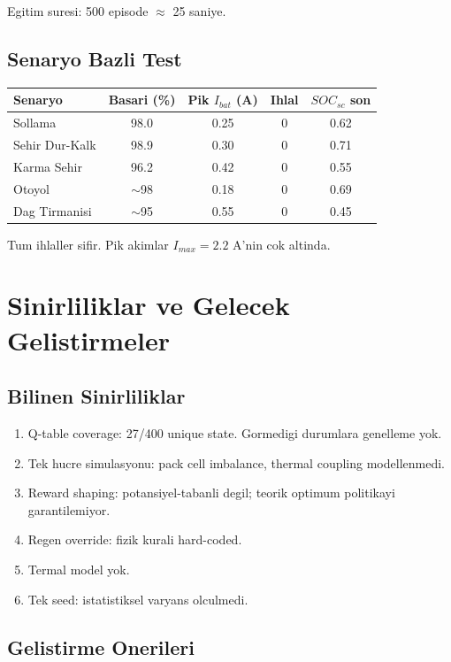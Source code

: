 \documentclass[11pt,a4paper]{article}
\begin{document}
Egitim suresi: 500 episode $\approx$ 25 saniye.

\subsection{Senaryo Bazli Test}

\begin{center}
\begin{tabular}{lcccc}
\toprule
Senaryo & Basari (\%) & Pik $I_{bat}$ (A) & Ihlal & $SOC_{sc}$ son \\
\midrule
Sollama        & 98.0 & 0.25 & 0 & 0.62 \\
Sehir Dur-Kalk & 98.9 & 0.30 & 0 & 0.71 \\
Karma Sehir    & 96.2 & 0.42 & 0 & 0.55 \\
Otoyol         & $\sim$98 & 0.18 & 0 & 0.69 \\
Dag Tirmanisi  & $\sim$95 & 0.55 & 0 & 0.45 \\
\bottomrule
\end{tabular}
\end{center}

Tum ihlaller sifir. Pik akimlar $I_{max}=2.2$ A'nin cok altinda.

\section{Sinirliliklar ve Gelecek Gelistirmeler}

\subsection{Bilinen Sinirliliklar}

\begin{enumerate}
  \item Q-table coverage: 27/400 unique state. Gormedigi durumlara genelleme yok.
  \item Tek hucre simulasyonu: pack cell imbalance, thermal coupling modellenmedi.
  \item Reward shaping: potansiyel-tabanli degil; teorik optimum politikayi garantilemiyor.
  \item Regen override: fizik kurali hard-coded.
  \item Termal model yok.
  \item Tek seed: istatistiksel varyans olculmedi.
\end{enumerate}

\subsection{Gelistirme Onerileri}
\end{document}
